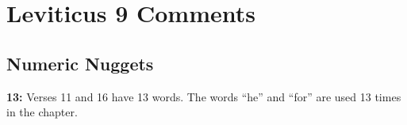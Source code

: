 \section{Leviticus 9 Comments}

\subsection{Numeric Nuggets}
\textbf{13: } Verses 11 and 16 have 13 words. The words ``he'' and ``for'' are used 13 times in the chapter.